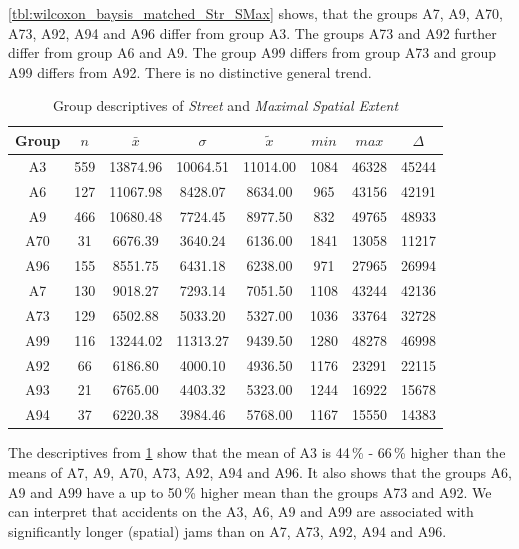 \cref{tbl:wilcoxon_baysis_matched_Str_SMax} shows, that the groups A7, A9, A70, A73, A92, A94 and A96 differ from group A3. The groups A73 and A92 further differ from group A6 and A9. The group A99 differs from group A73 and group A99 differs from A92. There is no distinctive general trend.
\begin{table}[ht!]
	\tiny
	\centering
	\begin{tabular}{c|c|c|c|c|c|c|c}
		\toprule
		Group & $n$ & $\bar{x}$ & $\sigma$ & $\tilde{x}$ & $min$ & $max$ & $\Delta$ \\  
		\midrule
		A3  & 559 & 13874.96 & 10064.51 & 11014.00 & 1084 & 46328 & 45244 \\ 
		A6  & 127 & 11067.98 & 8428.07  & 8634.00  & 965  & 43156 & 42191 \\ 
		A9  & 466 & 10680.48 & 7724.45  & 8977.50  & 832  & 49765 & 48933 \\ 
		A70 & 31  & 6676.39  & 3640.24  & 6136.00  & 1841 & 13058 & 11217 \\ 
		A96 & 155 & 8551.75  & 6431.18  & 6238.00  & 971  & 27965 & 26994 \\ 
		A7  & 130 & 9018.27  & 7293.14  & 7051.50  & 1108 & 43244 & 42136 \\ 
		A73 & 129 & 6502.88  & 5033.20  & 5327.00  & 1036 & 33764 & 32728 \\ 
		A99 & 116 & 13244.02 & 11313.27 & 9439.50  & 1280 & 48278 & 46998 \\ 
		A92 & 66  & 6186.80  & 4000.10  & 4936.50  & 1176 & 23291 & 22115 \\ 
		A93 & 21  & 6765.00  & 4403.32  & 5323.00  & 1244 & 16922 & 15678 \\ 
		A94 & 37  & 6220.38  & 3984.46  & 5768.00  & 1167 & 15550 & 14383 \\ 
		\bottomrule
	\end{tabular}
	\caption{Group descriptives of \textit{Street} and \textit{Maximal Spatial Extent}}
	\label{tbl:descriptives_baysis_matched_Str_SMax}
\end{table}
The descriptives from \cref{tbl:descriptives_baysis_matched_Str_SMax} show that the mean of A3 is 44\,\% - 66\,\% higher than the means of A7, A9, A70, A73, A92, A94 and A96. It also shows that the groups A6, A9 and A99 have a up to 50\,\% higher mean than the groups A73 and A92. We can interpret that accidents on the A3, A6, A9 and A99 are associated with significantly longer (spatial) jams than on A7, A73, A92, A94 and A96.

